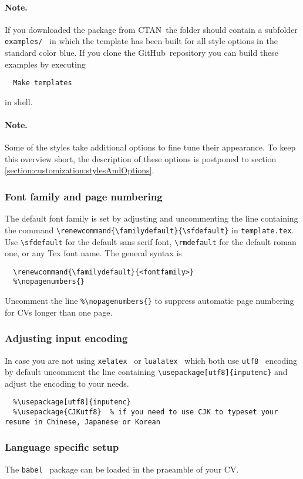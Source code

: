 \documentclass[a4paper,11pt]{article}
\newcommand{\code}[1]{\lstinline!#1!}
\newcommand{\Code}[1]{\lstinline!#1!~} %
\newcommand{\Github}{GitHub~}
\newcommand{\Ctan}{CTAN~}
\newcommand{\cvtemplate}{\code{template.tex}}
\begin{document}
\paragraph{Note.} If you downloaded the package from \Ctan the folder should contain a subfolder 
\Code{examples/} in which the template has been built for all style options in the standard color blue. 
If you clone the \Github repository you can build these examples by executing 
\begin{lstlisting}
  Make templates
\end{lstlisting}
in shell.


\paragraph{Note.} Some of the styles take additional options to fine tune their appearance. To keep 
this overview short, the description of these options is postponed to section \ref{section:customization:stylesAndOptions}.

\subsubsection*{Font family and page numbering}
The default font family is set by adjusting and uncommenting the line containing the command 
\lstinline!\renewcommand{\familydefault}{\sfdefault}! in \cvtemplate.
Use \lstinline!\sfdefault! for the default sans serif font, \lstinline!\rmdefault! for the default roman one, or any Tex font name. The general syntax is
\begin{lstlisting}
  \renewcommand{\familydefault}{<fontfamily>}
  %\nopagenumbers{}
\end{lstlisting}
 Uncomment the line \lstinline!%\nopagenumbers{}! to suppress automatic page numbering for CVs longer than one page.

\subsubsection*{Adjusting input encoding}
In case you are not using \Code{xelatex} or \Code{lualatex} which both use \Code{utf8} encoding by default uncomment the line containing \lstinline!\usepackage[utf8]{inputenc}! and adjust the encoding to your needs. 
\begin{lstlisting}
  %\usepackage[utf8]{inputenc}
  %\usepackage{CJKutf8}  % if you need to use CJK to typeset your resume in Chinese, Japanese or Korean
\end{lstlisting}
\subsubsection{Language specific setup}
The \Code{babel} package can be loaded in the praeamble of your CV. 
\end{document}
